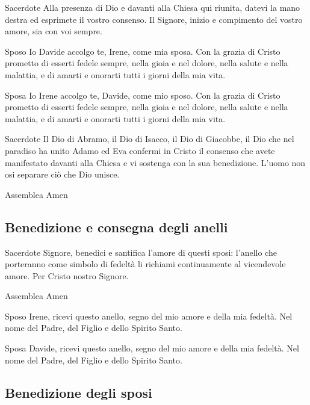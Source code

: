 \begin{dialoghi}
\item[Sacerdote] Alla presenza di Dio e davanti alla Chiesa qui riunita, datevi la mano destra ed esprimete il vostro consenso. Il Signore, inizio e compimento del vostro amore, sia con voi sempre.
\item[Sposo] Io Davide accolgo te, Irene, come mia sposa. Con la grazia di Cristo prometto di esserti fedele sempre, nella gioia e nel dolore, nella salute e nella malattia, e di amarti e onorarti tutti i giorni della mia vita.
\item[Sposa] Io Irene accolgo te, Davide, come mio sposo. Con la grazia di Cristo prometto di esserti fedele sempre, nella gioia e nel dolore, nella salute e nella malattia, e di amarti e onorarti tutti i giorni della mia vita.
\item[Sacerdote] Il Dio di Abramo, il Dio di Isacco, il Dio di Giacobbe, il Dio che nel paradiso ha unito Adamo ed Eva confermi in Cristo il consenso che avete manifestato davanti alla Chiesa e vi sostenga con la sua benedizione. L'uomo non osi separare ciò che Dio unisce.
\item[Assemblea] Amen
\end{dialoghi}

\subsection*{Benedizione e consegna degli anelli}

\begin{dialoghi}
\item[Sacerdote] Signore, benedici e santifica l'amore di questi sposi: l'anello che porteranno come simbolo di fedeltà li richiami continuamente al vicendevole amore. Per Cristo nostro Signore.
\item[Assemblea] Amen
\item[Sposo] Irene, ricevi questo anello, segno del mio amore e della mia fedeltà. Nel nome del Padre, del Figlio e dello Spirito Santo.
\item[Sposa] Davide, ricevi questo anello, segno del mio amore e della mia fedeltà. Nel nome del Padre, del Figlio e dello Spirito Santo.
\end{dialoghi}

\subsection*{Benedizione degli sposi}

